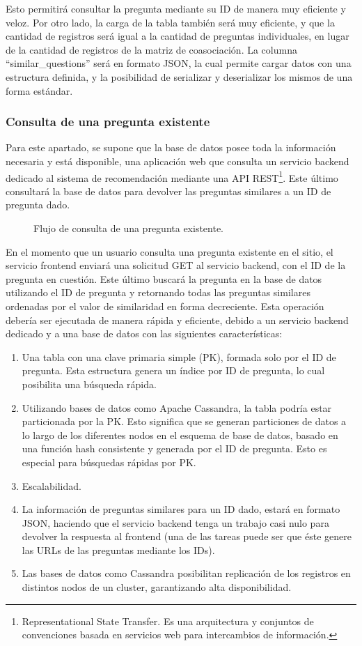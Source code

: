 Esto permitirá consultar la pregunta mediante su ID de manera muy eficiente y veloz. Por otro lado, la carga de la tabla también será muy eficiente, y que la cantidad de registros será igual a la cantidad de preguntas individuales, en lugar de la cantidad de registros de la matriz de coasociación. La columna “similar\_questions” será en formato JSON, la cual permite cargar datos con una estructura definida, y la posibilidad de serializar y deserializar los mismos de una forma estándar.

\subsubsection{Consulta de una pregunta existente}
Para este apartado, se supone que la base de datos posee toda la información necesaria y está disponible, una aplicación web que consulta un servicio backend dedicado al sistema de recomendación mediante una API REST\footnote{Representational State Transfer. Es una arquitectura y conjuntos de convenciones basada en servicios web para intercambios de información.}. Este último consultará la base de datos para devolver las preguntas similares a un ID de pregunta dado.

\begin{figure}
	\def\svgwidth{\linewidth}
	
	\caption{Flujo de consulta de una pregunta existente.}
\end{figure}

En el momento que un usuario consulta una pregunta existente en el sitio, el servicio frontend enviará una solicitud GET al servicio backend, con el ID de la pregunta en cuestión. Este último buscará la pregunta en la base de datos utilizando el ID de pregunta y retornando todas las preguntas similares ordenadas por el valor de similaridad en forma decreciente. Esta operación debería ser ejecutada de manera rápida y eficiente, debido a un servicio backend dedicado y a una base de datos con las siguientes características:
\begin{enumerate}
	\item Una tabla con una clave primaria simple (PK), formada solo por el ID de pregunta. Esta estructura genera un índice por ID de pregunta, lo cual posibilita una búsqueda rápida.
	\item Utilizando bases de datos como Apache Cassandra,  la tabla podría estar particionada por la PK. Esto significa que se generan particiones de datos a lo largo de los diferentes nodos en el esquema de base de datos, basado en una función hash consistente y generada por el ID de pregunta. Esto es especial para búsquedas rápidas por PK.
	\item Escalabilidad.
	\item La información de preguntas similares para un ID dado, estará en formato JSON, haciendo que el servicio backend tenga un trabajo casi nulo para devolver la respuesta al frontend (una de las tareas puede ser que éste genere las URLs de las preguntas mediante los IDs).
	\item Las bases de datos como Cassandra posibilitan replicación de los registros en distintos nodos de un cluster, garantizando alta disponibilidad.
\end{enumerate}


